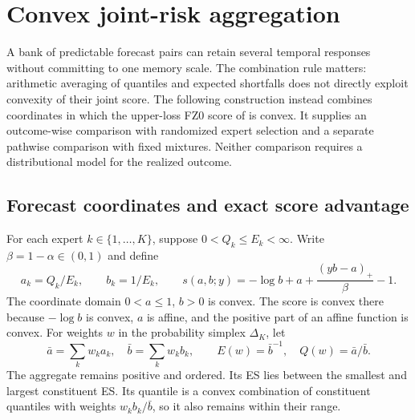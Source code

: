 \documentclass[11pt,a4paper]{article}
\theoremstyle{definition}\newtheorem{definition}[theorem]{Definition}
\begin{document}
\section{Convex joint-risk aggregation}\label{sec:aggregation}
A bank of predictable forecast pairs can retain several temporal responses without committing to one memory scale. The combination rule matters: arithmetic averaging of quantiles and expected shortfalls does not directly exploit convexity of their joint score. The following construction instead combines coordinates in which the upper-loss FZ0 score of \citet{patton2019es} is convex. It supplies an outcome-wise comparison with randomized expert selection and a separate pathwise comparison with fixed mixtures. Neither comparison requires a distributional model for the realized outcome.

\subsection{Forecast coordinates and exact score advantage}
For each expert $k\in\{1,\ldots,K\}$, suppose $0<Q_k\le E_k<\infty$. Write $\beta=1-\alpha\in(0,1)$ and define
\begin{equation}
 a_k=Q_k/E_k,\qquad b_k=1/E_k,\qquad
 s(a,b;y)=-\log b+a+\frac{(yb-a)_+}{\beta}-1.
 \label{eq:aggcoords}
\end{equation}
The coordinate domain $0<a\le1$, $b>0$ is convex. The score is convex there because $-\log b$ is convex, $a$ is affine, and the positive part of an affine function is convex. For weights $w$ in the probability simplex $\Delta_K$, let
\begin{equation}
 \bar a=\sum_k w_ka_k,\quad \bar b=\sum_k w_kb_k,
 \qquad E(w)=\bar b^{-1},\quad Q(w)=\bar a/\bar b.
 \label{eq:aggforecast}
\end{equation}
The aggregate remains positive and ordered. Its ES lies between the smallest and largest constituent ES. Its quantile is a convex combination of constituent quantiles with weights $w_kb_k/\bar b$, so it also remains within their range.
\end{document}
